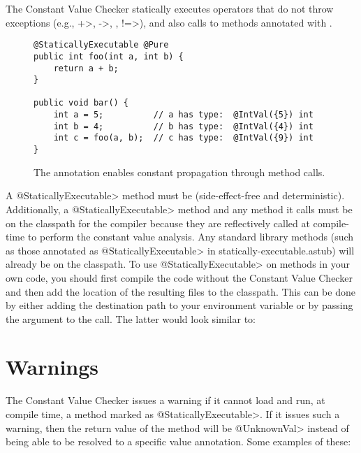The Constant Value Checker statically executes operators that do
not throw exceptions (e.g., \<+>, \<->, \code{<\relax<}, \<!=>), and also
calls to methods annotated with
.

\begin{figure}
\begin{Verbatim}
@StaticallyExecutable @Pure
public int foo(int a, int b) {
    return a + b;
}

public void bar() {
    int a = 5;          // a has type:  @IntVal({5}) int
    int b = 4;          // b has type:  @IntVal({4}) int
    int c = foo(a, b);  // c has type:  @IntVal({9}) int
}
\end{Verbatim}
\caption{The 
   annotation enables
  constant propagation through method calls.}
\label{fig-staticallyexecutable}
\end{figure}

A \<@StaticallyExecutable> method must
be  (side-effect-free and
deterministic).
Additionally, a \<@StaticallyExecutable> method and any method it calls must be on
the classpath for the compiler because they are reflectively called at
compile-time to perform the constant value analysis. Any standard
library methods (such as those annotated as \<@StaticallyExecutable> in
statically-executable.astub) will already be on the
classpath.
To use \<@StaticallyExecutable> on methods in your own code, you should
first compile the code without the Constant Value Checker and then add
the location of the resulting  files to the
classpath. This can be done by either adding the destination path to
your environment variable  or by passing the
argument  to the call. The latter
would look similar to:



\section{Warnings\label{value-checker-warnings}}

The Constant Value Checker issues a warning if it cannot load and run, at
compile time, a method marked as \<@StaticallyExecutable>.  If it issues
such a warning, then the return value of the method will be \<@UnknownVal>
instead of being able to be resolved to a specific value annotation.
Some examples of these:

